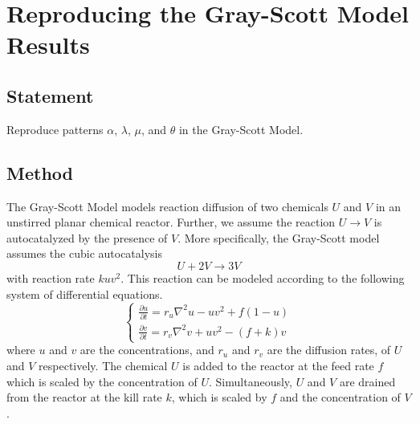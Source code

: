 \section{Reproducing the Gray-Scott Model Results}

\subsection{Statement}
Reproduce patterns $\alpha$, $\lambda$, $\mu$, and $\theta$ in the Gray-Scott Model.


\subsection{Method}

The Gray-Scott Model models reaction diffusion of two chemicals $U$ and $V$ in an unstirred planar chemical reactor.
Further, we assume the reaction $U \to V$ is autocatalyzed by the presence of $V$.
More specifically, the Gray-Scott model assumes the cubic autocatalysis
\begin{equation}
    U + 2V \to 3V
\end{equation}
with reaction rate $kuv^2$.
This reaction can be modeled according to the following system of differential equations.
\begin{equation}
    \begin{cases}
        \displaystyle{\frac{\partial u}{\partial t} = r_u \nabla^2 u - uv^2 + f(1 - u)} \\[20pt]
        \displaystyle{\frac{\partial v}{\partial t} = r_v \nabla^2 v + uv^2 - (f + k)v}
    \end{cases}\label{prob5:eqn:gray-scott}
\end{equation}
where $u$ and $v$ are the concentrations, and $r_u$ and $r_v$ are the diffusion rates, of $U$ and $V$ respectively.
The chemical $U$ is added to the reactor at the feed rate $f$ which is scaled by the concentration of $U$.
Simultaneously, $U$ and $V$ are drained from the reactor at the kill rate $k$, which is scaled by $f$ and the concentration of $V$.


